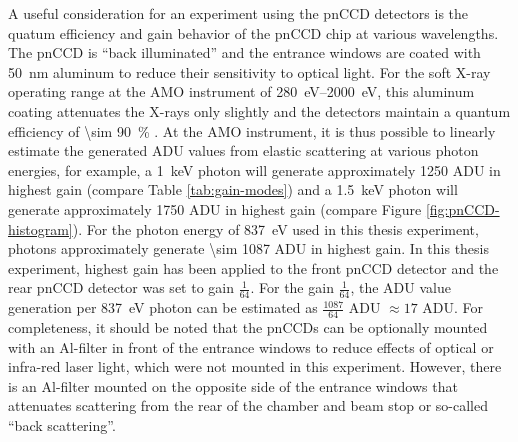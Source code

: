 A useful consideration for an experiment using the pnCCD detectors is the quatum efficiency and gain behavior of the pnCCD chip at various wavelengths. The pnCCD is ``back illuminated'' and the entrance windows are coated with \SI{50}{\nano\meter} aluminum to reduce their sensitivity to optical light. For the soft X-ray operating range at the AMO instrument of \SIrange{280}{2000}{\electronvolt}, this aluminum coating attenuates the X-rays only slightly and the detectors maintain a quantum efficiency of \SI{\sim 90}{\percent} \cite{Strueder-2010-NIMPA}. At the AMO instrument, it is thus possible to linearly estimate the generated ADU values from elastic scattering at various photon energies, for example, a \SI{1}{\kilo\electronvolt} photon will generate approximately \num{1250} ADU in highest gain (compare Table \ref{tab:gain-modes}) and a \SI{1.5}{\kilo\electronvolt} photon will generate approximately \num{1750} ADU in highest gain (compare Figure \ref{fig:pnCCD-histogram}). For the photon energy of \SI{837}{\electronvolt} used in this thesis experiment, photons approximately generate \num{\sim 1087} ADU in highest gain. In this thesis experiment, highest gain has been applied to the front pnCCD detector and the rear pnCCD detector was set to gain $\tfrac{1}{64}$. For the gain $\tfrac{1}{64}$, the ADU value generation per \SI{837}{\electronvolt} photon can be estimated as $\tfrac{1087}{64}$ ADU $\approx 17$ ADU. For completeness, it should be noted that the pnCCDs can be optionally mounted with an Al-filter in front of the entrance windows to reduce effects of optical or infra-red laser light, which were not mounted in this experiment. However, there is an Al-filter mounted on the opposite side of the entrance windows that attenuates scattering from the rear of the chamber and beam stop or so-called ``back scattering''.
%
%
%
%
%
